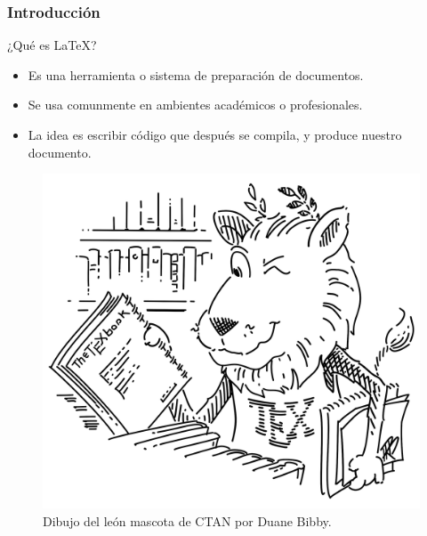 \begin{frame}
\frametitle{Introducción}
    \begin{tcolorbox}[colframe=color1]
        \begin{center}
            ¿Qué es \LaTeX ?
        \end{center}
    \end{tcolorbox}
    
    \begin{itemize}
        \item Es una herramienta o sistema de preparación de documentos.
        \item Se usa comunmente en ambientes académicos o profesionales.
        \item La idea es escribir código que después se compila, y produce nuestro documento.
        \end{itemize}    

    \begin{figure}[h]
        \centering
        \includegraphics[width=0.4\textheight]{../images/lion.png}
        \caption{Dibujo del león mascota de CTAN por Duane Bibby.}
    \end{figure}

\end{frame}

